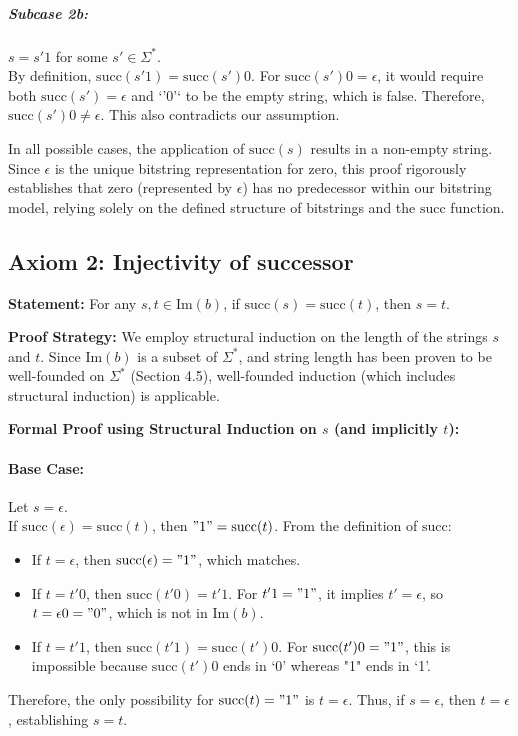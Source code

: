\documentclass[12pt, a4paper]{article}
\begin{document}
\subparagraph{Subcase 2b:} \( s = s'1 \) for some \( s' \in \Sigma^* \). \\
By definition, \(\mathrm{succ}(s'1) = \mathrm{succ}(s')0\). For \(\mathrm{succ}(s')0 = \epsilon\), it would require both \(\mathrm{succ}(s') = \epsilon\) and `'0'` to be the empty string, which is false. Therefore, \(\mathrm{succ}(s')0 \neq \epsilon\). This also contradicts our assumption.

In all possible cases, the application of \(\mathrm{succ}(s)\) results in a non-empty string. Since \(\epsilon\) is the unique bitstring representation for zero, this proof rigorously establishes that zero (represented by \(\epsilon\)) has no predecessor within our bitstring model, relying solely on the defined structure of bitstrings and the \(\mathrm{succ}\) function.

\subsection*{Axiom 2: Injectivity of successor}

\textbf{Statement:} For any \( s,t \in \mathrm{Im}(b) \), if \(\mathrm{succ}(s) = \mathrm{succ}(t)\), then \( s = t \).

\textbf{Proof Strategy:} We employ structural induction on the length of the strings \( s \) and \( t \). Since \(\mathrm{Im}(b)\) is a subset of \(\Sigma^*\), and string length has been proven to be well-founded on \(\Sigma^*\) (Section 4.5), well-founded induction (which includes structural induction) is applicable.

\textbf{Formal Proof using Structural Induction on \( s \) (and implicitly \( t \)):}

\paragraph{Base Case:} Let \( s = \epsilon \). \\
If \(\mathrm{succ}(\epsilon) = \mathrm{succ}(t)\), then \( "1" = \mathrm{succ}(t) \). From the definition of \(\mathrm{succ}\):
\begin{itemize}
    \item If \( t = \epsilon \), then \(\mathrm{succ}(\epsilon) = "1"\), which matches.
    \item If \( t = t'0 \), then \(\mathrm{succ}(t'0) = t'1\). For \( t'1 = "1" \), it implies \( t' = \epsilon \), so \( t = \epsilon 0 = "0" \), which is not in \(\mathrm{Im}(b)\).
    \item If \( t = t'1 \), then \(\mathrm{succ}(t'1) = \mathrm{succ}(t')0\). For \(\mathrm{succ}(t')0 = "1"\), this is impossible because \(\mathrm{succ}(t')0\) ends in `0' whereas "1" ends in `1'.
\end{itemize}
Therefore, the only possibility for \(\mathrm{succ}(t) = "1"\) is \( t = \epsilon \). Thus, if \( s = \epsilon \), then \( t = \epsilon \), establishing \( s = t \).
\end{document}
